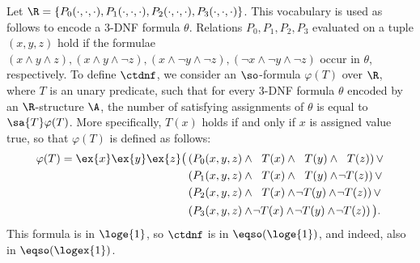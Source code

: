 
Let $\R = \{P_0(\cdot,\cdot,\cdot), P_1(\cdot,\cdot,\cdot), P_2(\cdot,\cdot,\cdot), P_3(\cdot,\cdot,\cdot)\}$. This vocabulary is used as follows to encode a 3-DNF formula $\theta$. Relations $P_0,P_1,P_2,P_3$ evaluated on a tuple $(x,y,z)$ hold if the formulae $(x\wedge y \wedge z),(x\wedge y \wedge \neg z),(x\wedge \neg y \wedge \neg z),(\neg x\wedge\neg y \wedge\neg z)$ occur in $\theta$, respectively.
To define $\ctdnf$, we consider an $\so$-formula $\varphi(T)$ over $\R$, where $T$ is an unary predicate, such that for every 3-DNF formula $\theta$ encoded by an $\R$-structure $\A$, the number of satisfying assignments of $\theta$ is equal to $\sa{T}\varphi(T)$. More specifically, $T(x)$ holds if and only if  $x$ is assigned value true, so that $\varphi(T)$ is defined as follows:
\begin{align*}
\varphi(T) = \ex{x}\ex{y}\ex{z}\big(\,
&(P_0(x,y,z)\wedge \ \; T(x)\wedge \ \; T(y)\wedge \ \; T(z))\,\vee\\
&(P_1(x,y,z)\wedge \ \; T(x)\wedge \ \; T(y)\wedge \!\neg T(z))\,\vee\\
&(P_2(x,y,z)\wedge \ \; T(x)\wedge\!\neg T(y)\wedge \!\neg T(z))\,\vee\\
&(P_3(x,y,z)\wedge \!\neg T(x)\wedge \!\neg T(y)\wedge \!\neg T(z))\,\big).
\end{align*}
This formula is in $\loge{1}$, so $\ctdnf$ is in $\eqso(\loge{1})$, and indeed, also in $\eqso(\logex{1})$. 

